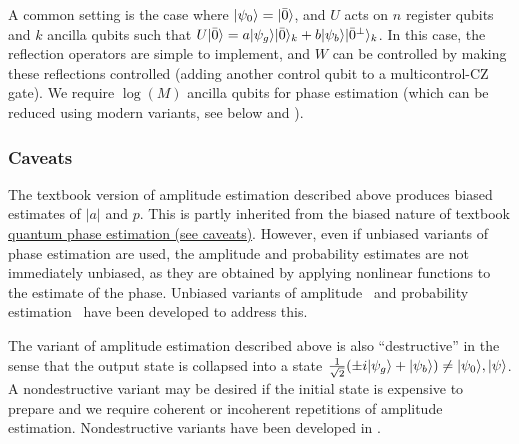 \begin{refsection}
A common setting is the case where $\lvert\psi_0\rangle = \lvert\bar{0}\rangle$, and $U$ acts on $n$ register qubits and $k$ ancilla qubits such that $U\lvert\bar{0}\rangle = a\lvert\psi_g\rangle\lvert\bar{0}\rangle_k + b \lvert\psi_b\rangle\lvert\bar{0}^\perp\rangle_k$. In this case, the reflection operators are simple to implement, and $W$ can be controlled by making these reflections controlled (adding another control qubit to a multicontrol-CZ gate). We require $\log(M)$ ancilla qubits for phase estimation (which can be reduced using modern variants, see below and \cite{rall2022amplitude}).



\subsubsection*{Caveats}
The textbook version of amplitude estimation described above produces biased estimates of $|a|$ and $p$. This is partly inherited from the biased nature of textbook \hyperref[prim:QPE]{quantum phase estimation (see caveats)}. However, even if unbiased variants of phase estimation are used, the amplitude and probability estimates are not immediately unbiased, as they are obtained by applying nonlinear functions to the estimate of the phase. Unbiased variants of amplitude~\cite{rall2022amplitude} and probability estimation~\cite{apeldoorn2022TomographyStatePreparationUnitaries} have been developed to address this.

The variant of amplitude estimation described above is also ``destructive'' in the sense that the output state is collapsed into a state $\frac{1}{\sqrt{2}}(\pm i \lvert\psi_g\rangle + \lvert\psi_b\rangle) \neq \lvert\psi_0\rangle, \lvert\psi\rangle$. A nondestructive variant may be desired if the initial state is expensive to prepare and we require coherent or incoherent repetitions of amplitude estimation. Nondestructive variants have been developed in \cite{harrow2020QuantumSimulatedAnnealing,cornelissen2022SublinearPartition,rall2022amplitude}.



\end{refsection}

